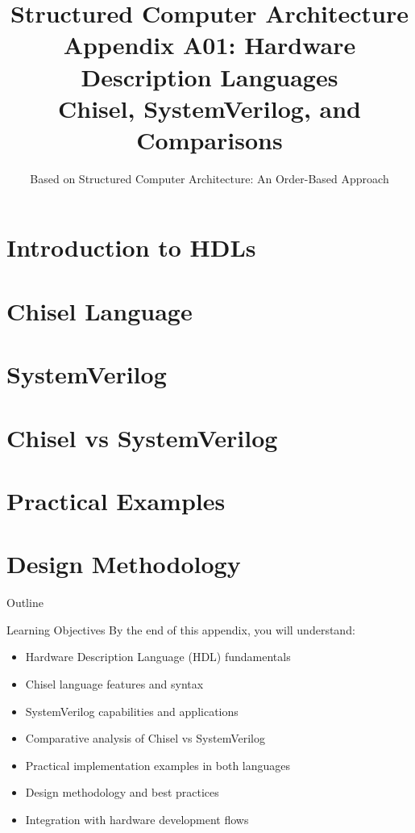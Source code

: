 \documentclass[aspectratio=169]{beamer}
\title[Appendix A01: Hardware Description Languages]{Structured Computer Architecture\\Appendix A01: Hardware Description Languages\\Chisel, SystemVerilog, and Comparisons}
\author{Based on Structured Computer Architecture: An Order-Based Approach}
\date{}
\begin{document}
\begin{frame}
\titlepage
\end{frame}

\setcounter{section}{0}

\section{Introduction to HDLs}
\section{Chisel Language}
\section{SystemVerilog}
\section{Chisel vs SystemVerilog}
\section{Practical Examples}
\section{Design Methodology}

\begin{frame}{Outline}
\tableofcontents
\end{frame}

\begin{frame}{Learning Objectives}
By the end of this appendix, you will understand:
\begin{itemize}
\item Hardware Description Language (HDL) fundamentals
\item Chisel language features and syntax
\item SystemVerilog capabilities and applications
\item Comparative analysis of Chisel vs SystemVerilog
\item Practical implementation examples in both languages
\item Design methodology and best practices
\item Integration with hardware development flows
\end{itemize}
\end{frame}
\end{document}
